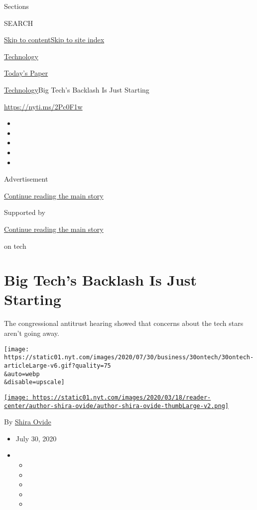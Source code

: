 Sections

SEARCH

\protect\hyperlink{site-content}{Skip to
content}\protect\hyperlink{site-index}{Skip to site index}

\href{https://www.nytimes.com/section/technology}{Technology}

\href{https://myaccount.nytimes.com/auth/login?response_type=cookie\&client_id=vi}{}

\href{https://www.nytimes.com/section/todayspaper}{Today's Paper}

\href{/section/technology}{Technology}\textbar{}Big Tech's Backlash Is
Just Starting

\url{https://nyti.ms/2Pc0F1w}

\begin{itemize}
\item
\item
\item
\item
\item
\end{itemize}

Advertisement

\protect\hyperlink{after-top}{Continue reading the main story}

Supported by

\protect\hyperlink{after-sponsor}{Continue reading the main story}

on tech

\hypertarget{big-techs-backlash-is-just-starting}{%
\section{Big Tech's Backlash Is Just
Starting}\label{big-techs-backlash-is-just-starting}}

The congressional antitrust hearing showed that concerns about the tech
stars aren't going away.

\texttt{[image: https://static01.nyt.com/images/2020/07/30/business/30ontech/30ontech-articleLarge-v6.gif?quality=75\\\&auto=webp\\\&disable=upscale]}

\href{https://www.nytimes.com/by/shira-ovide}{\texttt{[image: https://static01.nyt.com/images/2020/03/18/reader-center/author-shira-ovide/author-shira-ovide-thumbLarge-v2.png]}}

By \href{https://www.nytimes.com/by/shira-ovide}{Shira Ovide}

\begin{itemize}
\item
  July 30, 2020
\item
  \begin{itemize}
  \item
  \item
  \item
  \item
  \item
  \end{itemize}
\end{itemize}

